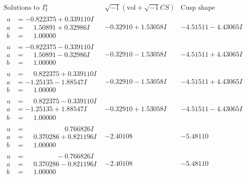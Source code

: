 \documentclass[1p]{elsarticle_modified}
\theoremstyle{definition}
\newcommand{\I}{\sqrt{-1}}
\begin{document}
$$\begin{array}{c|c|c}  
\text{Solutions to }I^u_{3}& \I (\text{vol} + \sqrt{-1}CS) & \text{Cusp shape}\\
 \hline 
\begin{aligned}
u &= -0.822375 + 0.339110 I \\
a &= \phantom{-}1.50891 + 0.32986 I \\
b &= \phantom{-}1.00000\phantom{ +0.000000I}\end{aligned}
 & -0.32910 + 1.53058 I & -4.51511 - 4.43065 I \\ \hline\begin{aligned}
u &= -0.822375 - 0.339110 I \\
a &= \phantom{-}1.50891 - 0.32986 I \\
b &= \phantom{-}1.00000\phantom{ +0.000000I}\end{aligned}
 & -0.32910 - 1.53058 I & -4.51511 + 4.43065 I \\ \hline\begin{aligned}
u &= \phantom{-}0.822375 + 0.339110 I \\
a &= -1.25135 - 1.88547 I \\
b &= \phantom{-}1.00000\phantom{ +0.000000I}\end{aligned}
 & -0.32910 - 1.53058 I & -4.51511 + 4.43065 I \\ \hline\begin{aligned}
u &= \phantom{-}0.822375 - 0.339110 I \\
a &= -1.25135 + 1.88547 I \\
b &= \phantom{-}1.00000\phantom{ +0.000000I}\end{aligned}
 & -0.32910 + 1.53058 I & -4.51511 - 4.43065 I \\ \hline\begin{aligned}
u &= \phantom{-0.000000 -}0.766826 I \\
a &= \phantom{-}0.370286 + 0.821196 I \\
b &= \phantom{-}1.00000\phantom{ +0.000000I}\end{aligned}
 & -2.40108\phantom{ +0.000000I} & -5.48110\phantom{ +0.000000I} \\ \hline\begin{aligned}
u &= \phantom{-0.000000 } -0.766826 I \\
a &= \phantom{-}0.370286 - 0.821196 I \\
b &= \phantom{-}1.00000\phantom{ +0.000000I}\end{aligned}
 & -2.40108\phantom{ +0.000000I} & -5.48110\phantom{ +0.000000I} \\ \hline\begin{aligned}

\end{aligned}
\end{array}$$
\end{document}
